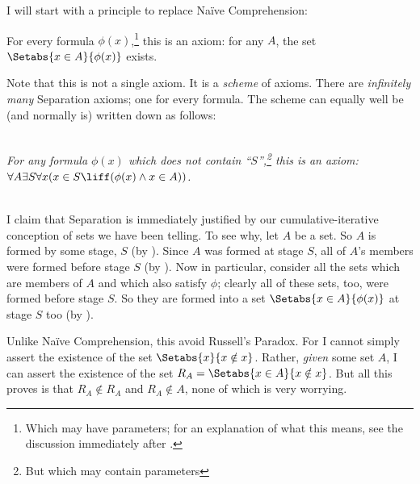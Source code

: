 \documentclass[../../../include/open-logic-section]{subfiles}
\begin{document}

I will start with a principle to replace Na\"{i}ve Comprehension:
\begin{axiom*} For every formula $\phi(x)$,\footnote{Which may have parameters; for an explanation of what this means, see the discussion immediately after .} this is an axiom: for any $A$, the set $\Setabs{x \in A}{\phi(x)}$ exists.
\end{axiom*}\noindent 
Note that this is not a single axiom. It is a \emph{scheme} of axioms. There are \emph{infinitely many} Separation axioms; one for every formula. The scheme can equally well be (and normally is) written down as follows:

\
\\\emph{For any formula $\phi(x)$ which does not contain ``$S$'',\footnote{But which may contain parameters} this is an axiom: \\$\forall A \exists S \forall x(x \in S \liff (\phi(x) \land x \in A))$.}

\
\\I claim that Separation is immediately justified by our cumulative-iterative conception of sets we have been telling. To see why, let $A$ be a set. So $A$ is formed by some stage, $S$ (by \stageshier). Since $A$ was formed at stage $S$, all of $A$'s members were formed before stage $S$ (by \stagesacc). Now in particular, consider all the sets which are members of $A$ and which also satisfy $\phi$; clearly all of these sets, too, were formed before stage $S$. So they are formed into a set $\Setabs{x \in A}{\phi(x)}$ at stage $S$ too (by \stagesacc). 

Unlike Na\"ive Comprehension, this avoid Russell's Paradox. For I cannot simply assert the existence of the set $\Setabs{x}{x \notin x}$. Rather, \emph{given} some set $A$, I can assert the existence of the set $R_A = \Setabs{x \in A}{x \notin x}$. But all this proves is that $R_A \notin R_A$ and $R_A \notin A$, none of which is very worrying. 
\end{document}
